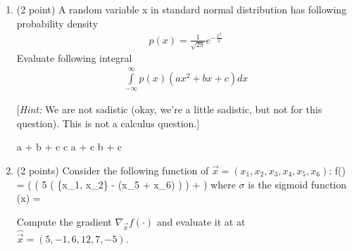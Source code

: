 \begin{enumerate}[start]
\item (2 point) A random variable x in standard normal distribution 
has following probability density
%
\begin{align}
p(x) = \frac{1}{{\sqrt {2\pi } }}{e^{ - \frac{{{x^2}}}{2}}}
\end{align}
%
Evaluate following integral
%
\begin{align}
\int\limits_{ - \infty }^\infty  {p(x)(a{x^2} + b{x} + c)dx}
\end{align}

[\emph{Hint:} We are not sadistic (okay, we're a little sadistic, but not for this question). This is not a calculus question.]\\

\begin{oneparcheckboxes}
	\choice a + b + c
	\choice c
	\CorrectChoice a + c
	\choice b + c
\end{oneparcheckboxes}

\vspace{2cm}

	\item
	(2 points)
	Consider the following function of $\vec{x} = (x_1, x_2, x_3, x_4, x_5, x_6)$:
	\beqn
	f() = \sigma\left( \log\left( 5 \left(
	\max\{x_1, x_2\} \cdot {} - (x_5 + x_6) \right)
	\right) +  \right)
	\eeqn
	where $\sigma$ is the sigmoid function
	\beqn
	\sigma(x) = 
	\eeqn
	
	Compute the gradient $\nabla_{\vec{x}} f(\cdot)$ and evaluate it at at $\hat{\vec{x}} = (5, -1, 6, 12, 7, -5)$.
	

\end{enumerate}
